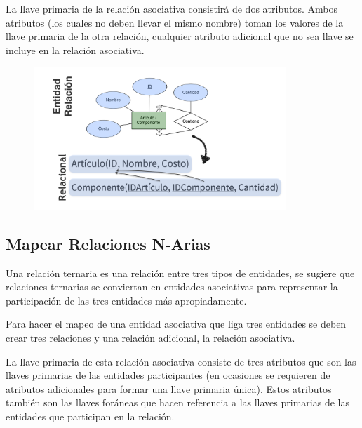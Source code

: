 \documentclass[12pt, fleqn]{report}                             %
\begin{document}
                La llave primaria de la relación asociativa consistirá de dos atributos.
                Ambos atributos (los cuales no deben llevar el mismo nombre) toman los valores de la llave
                primaria de la otra relación, cualquier atributo adicional que no sea llave se incluye en la
                relación asociativa.

                \begin{figure}[h]
                    \centering
                    \includegraphics[width=0.85\textwidth]{MapeoRelacionesUnariasMuchosMuchos}
                \end{figure}



            \clearpage
            \subsection{Mapear Relaciones N-Arias}

                Una relación ternaria es una relación entre tres tipos de entidades, se sugiere que
                relaciones ternarias se conviertan en entidades asociativas para representar la participación
                de las tres entidades más apropiadamente.


                Para hacer el mapeo de una entidad asociativa que liga tres entidades se deben crear tres
                relaciones y una relación adicional, la relación asociativa.

                La llave primaria de esta relación asociativa consiste de tres atributos que son las llaves
                primarias de las entidades participantes (en ocasiones se requieren de atributos adicionales
                para formar una llave primaria única). Estos atributos también son las llaves foráneas que hacen
                referencia a las llaves primarias de las entidades que participan en la relación.
\end{document}

